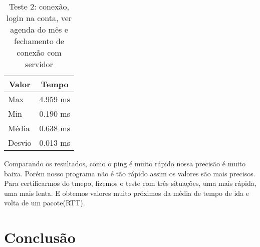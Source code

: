 \documentclass[10pt,a4paper]{article}
\begin{document}
\begin{table}[h!]
\caption{Teste 2: conexão, login na conta, ver agenda do mês e fechamento de conexão com servidor}
\begin{center}
  \begin{tabular}{lr}
    \multicolumn{1}{c}{Valor} & \multicolumn{1}{c}{Tempo}\\
    \hline
    Max & 4.959 ms\\
    Min & 0.190 ms\\
    Média & 0.638 ms \\
    Desvio & 0.013 ms
  \end{tabular}

\end{center}
\end{table}

Comparando os resultados, como o ping é muito rápido nossa precisão é
muito baixa. Porém nosso programa não é tão rápido assim os valores
são mais precisos. Para certificarmos do tmepo, fizemos o teste com
três situações, uma mais rápida, uma mais lenta. E obtemos valores
muito próximos da média de tempo de ida e volta de um pacote(RTT). 

\section{Conclusão}


\begin{small}
  
\end{small}
\end{document}
